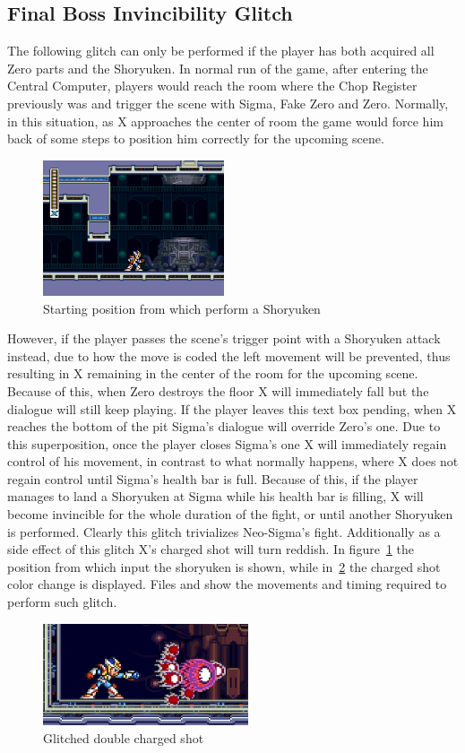 \subsection{Final Boss Invincibility Glitch}\label{Final_battle_glitch}
The following glitch can only be performed if the player has both acquired all Zero parts and the Shoryuken. In normal run of the game, after entering the Central Computer, players would reach the room where the Chop Register previously was and trigger the scene with Sigma, Fake Zero and Zero. Normally, in this situation, as X approaches the center of room the game would force him back of some steps to position him correctly for the upcoming scene. 
\begin{figure}[htp]
	\centering
	\includegraphics[height=4cm]{figures/X2/Miscs/Sigma_glitch_start.png}
	\caption{Starting position from which perform a Shoryuken}
	\label{X2_sigma_glitch_start}
\end{figure}
However, if the player passes the scene's trigger point with a Shoryuken attack instead, due to how the move is coded the left movement will be prevented, thus resulting in X remaining in the center of the room for the upcoming scene. Because of this, when Zero destroys the floor X will immediately fall but the dialogue will still keep playing. If the player leaves this text box pending, when X reaches the bottom of the pit Sigma's dialogue will override Zero's one. Due to this superposition, once the player closes Sigma's one X will immediately regain control of his movement, in contrast to what normally happens, where X does not regain control until Sigma's health bar is full. Because of this, if the player manages to land a Shoryuken at Sigma while his health bar is filling, X will become invincible for the whole duration of the fight, or until another Shoryuken is performed. Clearly this glitch trivializes Neo-Sigma's fight. Additionally as a side effect of this glitch X's charged shot will turn reddish.
In figure~\ref{X2_sigma_glitch_start} the position from which input the shoryuken is shown, while in~\ref{X2_glitch_shot} the charged shot color change is displayed. Files  and  show the movements and timing required to perform such glitch.


\begin{figure}[htp]
	\centering
	\includegraphics[height=3cm]{figures/X2/Miscs/glithced_double_shot.png}
	\caption{Glitched double charged shot}
	\label{X2_glitch_shot}
\end{figure}
